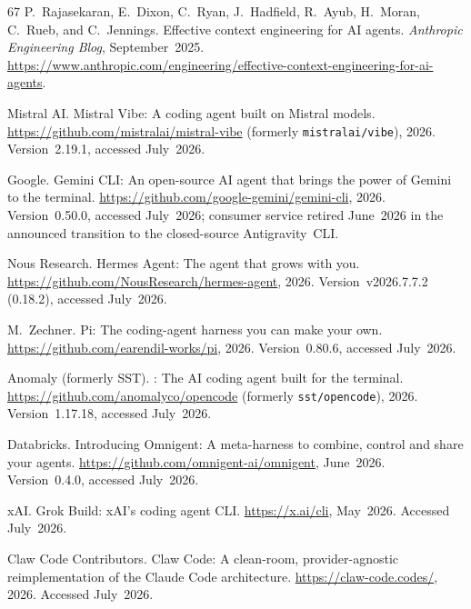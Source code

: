 \documentclass[11pt,a4paper]{article}
\begin{document}
\begin{thebibliography}{67}
P.~Rajasekaran, E.~Dixon, C.~Ryan, J.~Hadfield, R.~Ayub, H.~Moran, C.~Rueb, and C.~Jennings.
\newblock Effective context engineering for AI agents.
\newblock \emph{Anthropic Engineering Blog}, September~2025.
\newblock \url{https://www.anthropic.com/engineering/effective-context-engineering-for-ai-agents}.

{Mistral AI}.
\newblock Mistral Vibe: A coding agent built on Mistral models.
\newblock \url{https://github.com/mistralai/mistral-vibe} (formerly \texttt{mistralai/vibe}), 2026.
\newblock Version~2.19.1, accessed July~2026.

{Google}.
\newblock Gemini {CLI}: An open-source {AI} agent that brings the power of {Gemini} to the terminal.
\newblock \url{https://github.com/google-gemini/gemini-cli}, 2026.
\newblock Version~0.50.0, accessed July~2026; consumer service retired June~2026 in the announced transition to the closed-source Antigravity~CLI.

{Nous Research}.
\newblock Hermes Agent: The agent that grows with you.
\newblock \url{https://github.com/NousResearch/hermes-agent}, 2026.
\newblock Version~v2026.7.7.2 (0.18.2), accessed July~2026.

M.~Zechner.
\newblock Pi: The coding-agent harness you can make your own.
\newblock \url{https://github.com/earendil-works/pi}, 2026.
\newblock Version~0.80.6, accessed July~2026.

{Anomaly (formerly SST)}.
: The {AI} coding agent built for the terminal.
\newblock \url{https://github.com/anomalyco/opencode} (formerly \texttt{sst/opencode}), 2026.
\newblock Version~1.17.18, accessed July~2026.

{Databricks}.
\newblock Introducing Omnigent: A meta-harness to combine, control and share your agents.
\newblock \url{https://github.com/omnigent-ai/omnigent}, June~2026.
\newblock Version~0.4.0, accessed July~2026.

{xAI}.
\newblock Grok Build: {xAI}'s coding agent {CLI}.
\newblock \url{https://x.ai/cli}, May~2026.
\newblock Accessed July~2026.

{Claw Code Contributors}.
\newblock Claw Code: A clean-room, provider-agnostic reimplementation of the {Claude Code} architecture.
\newblock \url{https://claw-code.codes/}, 2026.
\newblock Accessed July~2026.


\end{thebibliography}
\end{document}
